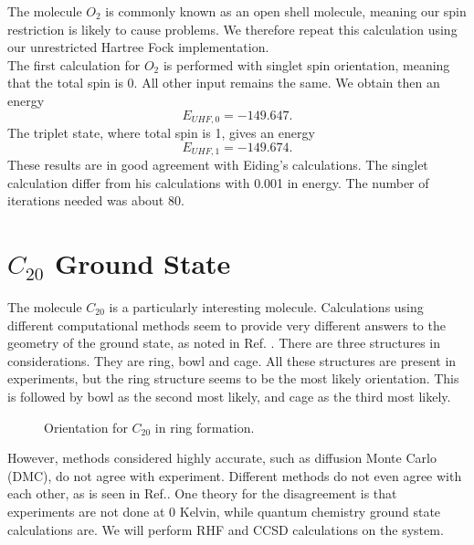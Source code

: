 The molecule $O_2$ is commonly known as an open shell molecule,
meaning our spin restriction is likely to cause problems. We therefore
repeat this calculation using our unrestricted Hartree Fock
implementation. \\

The first calculation for $O_2$ is performed with singlet spin
orientation, meaning that the total spin is 0. All other input remains
the same. We obtain then an energy 
\begin{equation}
E_{UHF,0} = -149.647 .
\end{equation}
The triplet state, where total spin is 1, gives an energy
\begin{equation}
E_{UHF,1} = -149.674  .
\end{equation}
These results are in good agreement with Eiding's calculations. The
singlet calculation differ from his calculations with 0.001 in
energy. 
The number of
iterations needed was about 80.

\section{$C_{20}$ Ground State} 
The molecule $C_{20}$ is a particularly interesting
molecule. Calculations using different computational methods seem to
provide very different answers to the geometry of the ground state, as
noted in Ref. \cite{c20article_cite_this}. There are three
structures in considerations. They are ring, bowl and cage. All these
structures are present in experiments, but the ring structure seems to be the most
likely orientation. This is followed by bowl as the second most
likely, and cage as the third most likely.  \\
\begin{figure}[h!]
\begin{center}
\caption{Orientation for $C_{20}$ in ring formation.}
\label{fig:c20ring}
\end{center}
\end{figure}

However, methods considered highly accurate, such as diffusion Monte Carlo (DMC), do not
agree with experiment. Different methods do not even agree with each
other, as is seen in Ref.\cite{c20coordinatesarticlezz}. One theory
for the disagreement is that experiments are not done at 0 Kelvin,
while quantum chemistry ground state calculations are. We will perform
RHF and CCSD calculations on the system. \\

